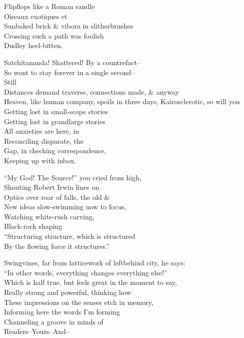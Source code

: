 \secdiv

Flipflops like a Roman sandle \\
Oiseaux exotiques et \\
Sunbaked brick \& vibora in slitherbrushes \\
Crossing such a path was foolish \\
Dudley heel-bitten.

Satchitananda! Shattered! By a countrefact-- \\
So wont to stay forever in a single second-- \\
Still \\
\qquad Distances demand traverse, connections made, \& anyway \\
Heaven, like human company, spoils in three days,
Kairosclerotic, so will you \\

Getting lost in small-scope stories \\
Getting lost in grandlarge stories \\
All anxieties are here, in \\
Reconciling disparate, the \\ 
Gap, in checking correspondence, \\
Keeping up with inbox.

``My God! The Source!'' you cried from high, \\
Shouting Robert Irwin lines on \\
Optics over roar of falls, the old \& \\
New ideas slow-swimming now to focus, \\
Watching white-rush carving, \\
Black-rock shaping \\
``Structuring structure, which is structured \\
By the flowing force it structures.''

Swingvines, far from latticework of leftbehind city, he says: \\
``In other words, everything changes everything else!'' \\
Which is half true, but feels great in the moment to say, \\
Really strong and powerful, thinking how \\
These impressions on the senses etch in memory, \\
Informing here the words I'm forming \\
Channeling a groove in minds of \\
Readers--Yours--And--

